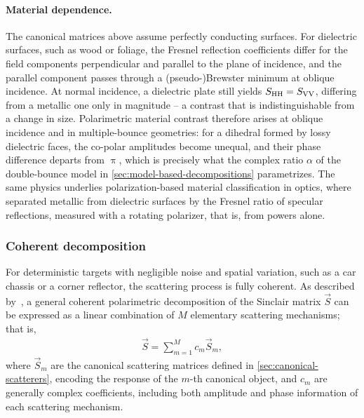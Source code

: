 \paragraph{Material dependence.}
The canonical matrices above assume perfectly conducting surfaces.
For dielectric surfaces, such as wood or foliage, the Fresnel reflection coefficients differ for the field components perpendicular and parallel to the plane of incidence, and the parallel component passes through a (pseudo-)Brewster minimum at oblique incidence.
At normal incidence, a dielectric plate still yields $S_{\mathrm{HH}} = S_{\mathrm{VV}}$, differing from a metallic one only in magnitude -- a contrast that is indistinguishable from a change in size.
Polarimetric material contrast therefore arises at oblique incidence and in multiple-bounce geometries: for a dihedral formed by lossy dielectric faces, the co-polar amplitudes become unequal, and their phase difference departs from $\uppi$, which is precisely what the complex ratio $\alpha$ of the double-bounce model in \cref{sec:model-based-decompositions} parametrizes.
The same physics underlies polarization-based material classification in optics, where \textcite{wolffPolarizationbasedMaterialClassification1990} separated metallic from dielectric surfaces by the Fresnel ratio of specular reflections, measured with a rotating polarizer, that is, from powers alone.


\subsubsection{Coherent decomposition}
\label{sec:coherent-decomposition}

For deterministic targets with negligible noise and spatial variation, such as a car chassis or a corner reflector, the scattering process is fully coherent.
As described by~\textcite{gaglioneKrogagerDecompositionPseudoZernike2014}, a general coherent polarimetric decomposition of the Sinclair matrix $\vec S$ can be expressed as a linear combination of $M$ elementary scattering mechanisms; that is,
\begin{align}
    \vec S = \sum_{m=1}^M c_m \vec S_m,
\end{align}
where $\vec S_m$ are the canonical scattering matrices defined in \cref{sec:canonical-scatterers}, encoding the response of the $m$-th canonical object, and $c_m$ are generally complex coefficients, including both amplitude and phase information of each scattering mechanism.

